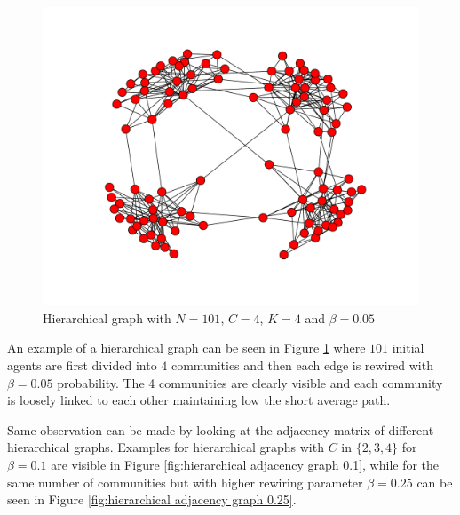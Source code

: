 \begin{figure}[h]
\centering
\includegraphics[scale=0.4]{images/topology/hierarchical_graph_4_dot05.pdf}
\caption{Hierarchical graph with $N=101$, $C=4$, $K=4$ and $\beta = 0.05$}
\label{fig:hierarchical graph 4}
\end{figure}

An example of a hierarchical graph can be seen in Figure \ref{fig:hierarchical graph 4} where $101$ initial agents are first divided into $4$ communities and then each edge is rewired with $\beta=0.05$ probability. 
The 4 communities are clearly visible and each community is loosely linked to each other maintaining low the short average path.

Same observation can be made by looking at the adjacency matrix of different hierarchical graphs.
Examples for hierarchical graphs with $C$ in $\{2,3,4\}$ for $\beta=0.1$ are visible in Figure  \ref{fig:hierarchical adjacency graph 0.1}, while for the same number of communities but with higher rewiring parameter $\beta=0.25$ can be seen in Figure \ref{fig:hierarchical adjacency graph 0.25}.

